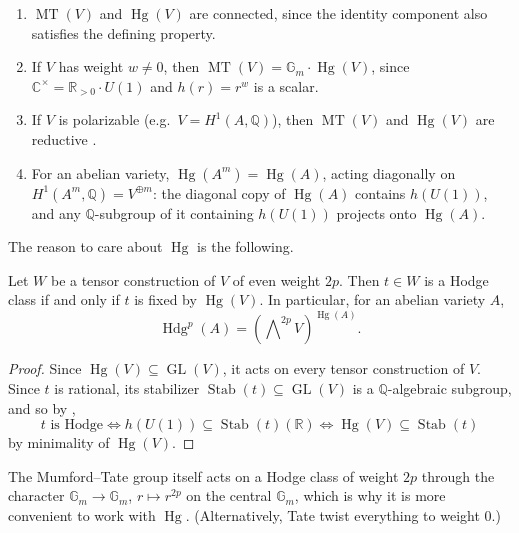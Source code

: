 \documentclass[12pt]{amsart}
\newcommand{\R}{\mathbb{R}}
\newcommand{\Q}{\mathbb{Q}}
\newcommand{\C}{\mathbb{C}}
\newcommand{\Gm}{\mathbb{G}_m}
\DeclareMathOperator{\GL}{GL}
\DeclareMathOperator{\MT}{MT}
\DeclareMathOperator{\Hg}{Hg}
\DeclareMathOperator{\Hdg}{Hdg}
\DeclareMathOperator{\Stab}{Stab}
\let\oldbigwedge\bigwedge
\renewcommand{\bigwedge}{\mathop{\textstyle\oldbigwedge}\nolimits}
\theoremstyle{definition}
\theoremstyle{remark}
\numberwithin{equation}{section}
\begin{document}
\begin{remark}\label{rmk:MT-basic}
    \begin{enumerate}[label=(\arabic*)]
        \item $\MT(V)$ and $\Hg(V)$ are connected, since the identity component
        also satisfies the defining property.
        \item If $V$ has weight $w \neq 0$, then $\MT(V) = \Gm \cdot \Hg(V)$,
        since $\C^\times = \R_{>0} \cdot U(1)$ and $h(r) = r^w$ is a scalar.
        \item If $V$ is polarizable (e.g.\ $V = H^1(A,\Q)$), then $\MT(V)$ and
        $\Hg(V)$ are reductive \cite{Deligne82, Moonen04}.
        \item For an abelian variety, $\Hg(A^m) = \Hg(A)$, acting diagonally on
        $H^1(A^m, \Q) = V^{\oplus m}$: the diagonal copy of $\Hg(A)$ contains
        $h(U(1))$, and any $\Q$-subgroup of it containing $h(U(1))$ projects
        onto $\Hg(A)$.
    \end{enumerate}
\end{remark}

The reason to care about $\Hg$ is the following.

\begin{proposition}\label{prop:key}
    Let $W$ be a tensor construction of $V$ of even weight $2p$. Then
    $t \in W$ is a Hodge class if and only if $t$ is fixed by $\Hg(V)$. In
    particular, for an abelian variety $A$,
    \begin{equation*}
        \Hdg^p(A) = (\bigwedge^{2p} V)^{\Hg(A)}.
    \end{equation*}
\end{proposition}
\begin{proof}
    Since $\Hg(V) \subseteq \GL(V)$, it acts on every tensor construction of
    $V$. Since $t$ is rational, its stabilizer $\Stab(t) \subseteq \GL(V)$ is
    a $\Q$-algebraic subgroup, and so by ,
    \begin{equation*}
        t \text{ is Hodge} \iff h(U(1)) \subseteq \Stab(t)(\R) \iff
        \Hg(V) \subseteq \Stab(t)
    \end{equation*}
    by minimality of $\Hg(V)$.
\end{proof}

\begin{remark}
    The Mumford--Tate group itself acts on a Hodge class of weight $2p$ through
    the character $\Gm \to \Gm$, $r \mapsto r^{2p}$ on the central $\Gm$, which
    is why it is more convenient to work with $\Hg$. (Alternatively, Tate twist
    everything to weight $0$.)
\end{remark}
\end{document}
